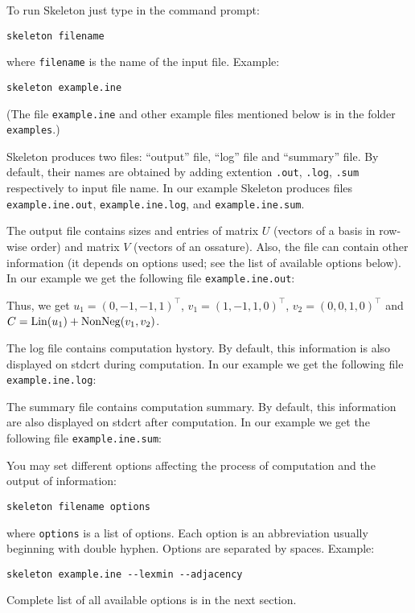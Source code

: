 \documentclass{article}
\newcommand{\Skeleton}{{\sc Skeleton}\xspace}
\newcommand{\Lin}{\mathop{\rm Lin}\nolimits}
\newcommand{\NonNeg}{\mathop{\rm NonNeg}\nolimits}
\newcommand{\transpose}{^{\top}}
\begin{document}
To run \Skeleton just type in the command prompt:
\begin{verbatim}
skeleton filename
\end{verbatim}
where \verb$filename$ is the name of the input file.
Example:
\begin{verbatim}
skeleton example.ine
\end{verbatim}
(The file \verb$example.ine$ and other example files mentioned below is in the folder \verb$examples$.)

\Skeleton produces two files: ``output'' file, ``log'' file
and ``summary'' file. 
By default, their names are obtained by adding
extention \verb$.out$, \verb$.log$, \verb$.sum$  respectively to input file name. 
In our example \Skeleton produces files \verb$example.ine.out$, \verb$example.ine.log$, 
and \verb$example.ine.sum$.

The output file contains sizes and entries of matrix $U$ (vectors of a
basis in row-wise order) and matrix $V$ (vectors of an ossature). Also, the
file can contain other information (it depends on options used; see the
list of available options below). In our example we get the following file
\verb$example.ine.out$: 

Thus, we get 
$u_1 = (0, -1, -1, 1)\transpose$, 
$v_1 = (1, -1,  1, 0)\transpose$, 
$v_2 = (0,  0,  1, 0)\transpose$ and
$C=\Lin(u_1) + \NonNeg(v_1, v_2)$.


The log file contains computation hystory.
By default, this information is also displayed on stdcrt during computation. 
In our example we get the following file \verb$example.ine.log$:


The summary file contains computation summary.
By default, this information are also displayed on stdcrt after computation. 
In our example we get the following file \verb$example.ine.sum$:


You may set different options affecting the process of computation and
the output of information:
\begin{verbatim}
skeleton filename options
\end{verbatim}
where \verb$options$
is a list of options. Each option is
an abbreviation usually beginning with double hyphen. Options are separated by spaces.
Example:
\begin{verbatim}
skeleton example.ine --lexmin --adjacency
\end{verbatim}
Complete list of all available options is in the next section.
\end{document}
